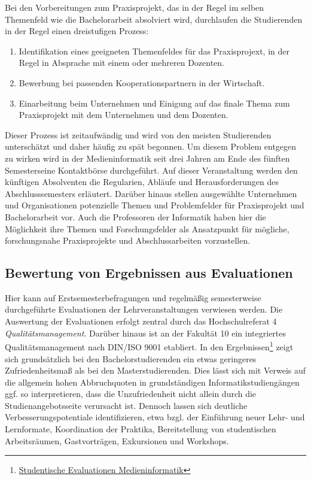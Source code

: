 Bei den Vorbereitungen zum Praxisprojekt, das in der Regel im selben
Themenfeld wie die Bachelorarbeit absolviert wird, durchlaufen die
Studierenden in der Regel einen dreistufigen Prozess:

\begin{enumerate}
\def\labelenumi{\arabic{enumi}.}
\tightlist
\item
  Identifikation eines geeigneten Themenfeldes für das Praxisprojext, in
  der Regel in Absprache mit einem oder mehreren Dozenten.
\item
  Bewerbung bei passenden Kooperationspartnern in der Wirtschaft.
\item
  Einarbeitung beim Unternehmen und Einigung auf das finale Thema zum
  Praxisprojekt mit dem Unternehmen und dem Dozenten.
\end{enumerate}

Dieser Prozess ist zeitaufwändig und wird von den meisten Studierenden
unterschätzt und daher häufig zu spät begonnen. Um diesem Problem
entgegen zu wirken wird in der Medieninformatik seit drei Jahren am Ende
des fünften Semesterseine Kontaktbörse durchgeführt. Auf dieser
Veranstaltung werden den künftigen Absolventen die Regularien, Abläufe
und Herausforderungen des Abschlusssemesters erläutert. Darüber hinaus
stellen ausgewählte Unternehmen und Organisationen potenzielle Themen
und Problemfelder für Praxisprojekt und Bachelorarbeit vor. Auch die
Professoren der Informatik haben hier die Möglichkeit ihre Themen und
Forschungsfelder als Ansatzpunkt für mögliche, forschungsnahe
Praxisprojekte und Abschlussarbeiten vorzustellen.

\subsection{Bewertung von Ergebnissen aus
Evaluationen}\label{bewertung-von-ergebnissen-aus-evaluationen}

Hier kann auf Erstsemesterbefragungen und regelmäßig semesterweise
durchgeführte Evaluationen der Lehrveranstaltungen verwiesen werden. Die
Auswertung der Evaluationen erfolgt zentral durch das Hochschulreferat 4
\emph{Qualitätsmanagement}. Darüber hinaus ist an der Fakultät 10 ein
integriertes Qualitätsmanagement nach DIN/ISO 9001 etabliert. In den
Ergebnissen\footnote{\href{../anhaenge/evaluationen-f10.pdf}{Studentische
  Evaluationen Medieninformatik}} zeigt sich grundsätzlich bei den
Bachelorstudierenden ein etwas geringeres Zufriedenheitsmaß als bei den
Masterstudierenden. Dies lässt sich mit Verweis auf die allgemein hohen
Abbruchquoten in grundständigen Informatikstudiengängen ggf. so
interpretieren, dass die Unzufriedenheit nicht allein durch die
Studienangebotsseite verursacht ist. Dennoch lassen sich deutliche
Verbesserungspotentiale identifizieren, etwa bzgl. der Einführung neuer
Lehr- und Lernformate, Koordination der Praktika, Bereitstellung von
studentischen Arbeitsräumen, Gastvorträgen, Exkursionen und Workshops.

